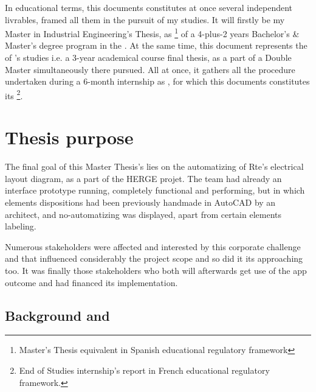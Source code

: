In educational terms, this documents constitutes at once several independent livrables, framed all them in the pursuit of my studies. It will firstly be my Master in Industrial Engineering's Thesis, as \footnote{Master's Thesis equivalent in Spanish educational regulatory framework} of a 4-plus-2 years Bachelor's \& Master's degree program in the . At the same time, this document represents the  of 's studies i.e. a 3-year academical course final thesis, as a part of a Double Master simultaneously there pursued.
All at once, it gathers all the procedure undertaken during a 6-month internship as , for which this documents constitutes its \footnote{End of Studies internship's report in French educational regulatory framework.}.


\section{Thesis purpose}
\label{sec:Intro:thesis-purpose}

The final goal of this Master Thesis's lies on the automatizing of Rte's electrical layout diagram, as a part of the HERGE projet. The team had already an interface prototype running, completely functional and performing, but in which elements dispositions had been previously handmade in AutoCAD by an architect, and no-automatizing was displayed, apart from certain elements labeling.

Numerous stakeholders were affected and interested by this corporate challenge and that influenced considerably the project scope and so did it its approaching too. It was finally those stakeholders who both will afterwards get use of the app outcome and had financed its implementation.


\subsection{Background and }
\label{sec:intro:thesis-purpose:background}

